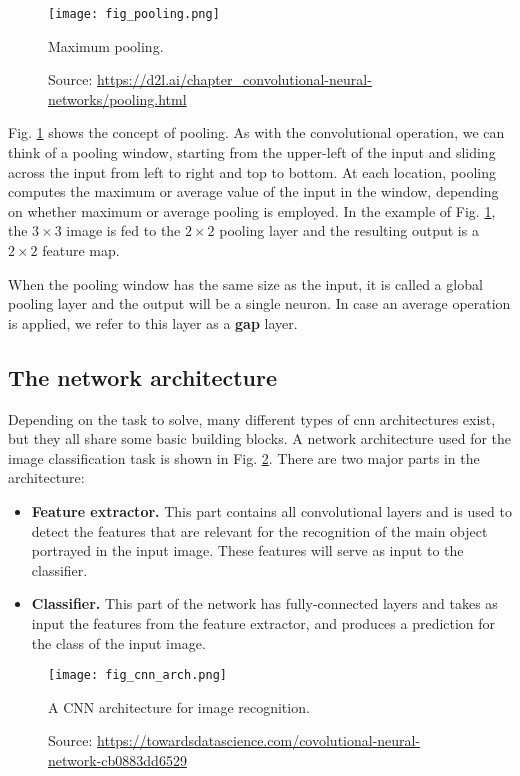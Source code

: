 \begin{figure}[ht]
    \begin{center}       
    \texttt{[image: fig\_pooling.png]}
    \caption[Maximum pooling]{Maximum pooling.}
    \caption*{Source: \href{https://d2l.ai/chapter\_convolutional-neural-networks/pooling.html}{https://d2l.ai/chapter\_convolutional-neural-networks/pooling.html}}
    \label{fig:pooling}
    \end{center}
\end{figure}

Fig. \ref{fig:pooling} shows the concept of pooling. As with the convolutional operation, we can think of a pooling window, starting from the upper-left of the input and sliding across the input from left to right and top to bottom. At each location, pooling computes the maximum or average value of the input in the window, depending on whether maximum or average pooling is employed. In the example of Fig. \ref{fig:pooling}, the $3 \times 3$ image is fed to the $2 \times 2$ pooling layer and the resulting output is a $2 \times 2$ feature map.

When the pooling window has the same size as the input, it is called a global pooling layer and the output will be a single neuron. In case an average operation is applied, we refer to this layer as a \textbf{\acrfull{gap}} layer.


\subsection{The network architecture}
Depending on the task to solve, many different types of \acrshort{cnn} architectures exist, but they all share some basic building blocks. A network architecture used for the image classification task is shown in Fig. \ref{fig:cnn_arch}. There are two major parts in the architecture:
\begin{itemize}
\item \textbf{Feature extractor.} This part contains all convolutional layers and is used to detect the features that are relevant for the recognition of the main object portrayed in the input image. These features will serve as input to the classifier.
\item \textbf{Classifier.} This part of the network has fully-connected layers and takes as input the features from the feature extractor, and produces a   prediction for the class of the input image.
\end{itemize}
\begin{figure}[ht]
    \begin{center}       
    \texttt{[image: fig\_cnn\_arch.png]}
    \caption[A CNN architecture for image recognition]{A CNN architecture for image recognition.}
    \caption*{Source: \href{https://towardsdatascience.com/covolutional-neural-network-cb0883dd6529}{https://towardsdatascience.com/covolutional-neural-network-cb0883dd6529}}
    \label{fig:cnn_arch}
    \end{center}
\end{figure}

